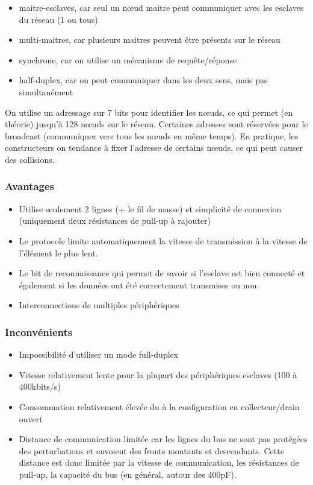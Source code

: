 \documentclass[french,a4paper,12pt]{report}
\begin{document}
			\begin{itemize}
			\item maitre-esclaves, car seul un nœud maitre peut communiquer avec les esclaves du réseau (1 ou tous)
			\item multi-maitres, car plusieurs maitres peuvent être présents sur le réseau
			\item synchrone, car on utilise un mécanisme de requête/réponse
			\item half-duplex, car on peut communiquer dans les deux sens, mais pas simultanément
			\end{itemize}
 
On utilise un adressage sur 7 bits pour identifier les nœuds, ce qui permet (en théorie) jusqu’à 128 nœuds sur le réseau. Certaines adresses sont réservées pour le broadcast (communiquer vers tous les nœuds en même temps). En pratique, les constructeurs on tendance à fixer l’adresse de certains nœuds, ce qui peut causer des collisions.
 
 
  		\subsubsection{Avantages}
			\begin{itemize}
			\item Utilise seulement 2 lignes (+ le fil de masse) et simplicité de connexion (uniquement deux résistances de pull-up à rajouter) 
			\item Le protocole limite automatiquement la vitesse de transmission à la vitesse de l’élément le plus lent. 
			\item Le bit de reconnaissance qui permet de savoir si l’esclave est bien connecté et également si les données ont été correctement transmises ou non. 
			\item Interconnections de multiples périphériques
			\end{itemize}
 
  		\subsubsection{Inconvénients}
			\begin{itemize}
			\item Impossibilité d’utiliser un mode full-duplex 
			\item Vitesse relativement lente pour la plupart des périphériques esclaves (100 à 400kbits/s) 
			\item Consommation relativement élevée du à la configuration en collecteur/drain ouvert 
			\item Distance de communication limitée car les lignes du bus ne sont pas protégées des perturbations et envoient des fronts montants et descendants. Cette distance est donc limitée par la vitesse de communication, les résistances de pull-up, la capacité du bus (en général, autour des 400pF).
\end{itemize}
 
\end{document}
